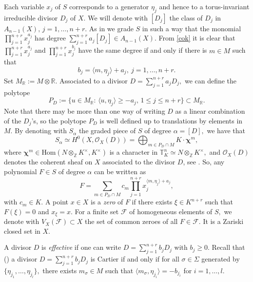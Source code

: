 \documentclass[a4paper,11pt]{amsart}
\newcommand{\R}{\mathbb{R}}
\newcommand{\T}{\mathbb{T}}
\newcommand{\Z}{\mathbb{Z}}
\newcommand{\cF}{{\mathcal F}}
\newcommand{\cO}{{\mathcal O}}
\newcommand{\bfchi}{{\boldsymbol{\chi}}}
\numberwithin{thm}{section}
\numberwithin{equation}{section}
\theoremstyle{definition}
\theoremstyle{plain}
\begin{document}
Each variable $x_j$ of $S$ corresponds to a generator $\eta_j$ and hence to a torus-invariant irreducible divisor $D_j$ of $X.$ We will  denote with $[D_j]$ the class of $D_j$ in $A_{n-1}(X),\, j=1,\ldots, n+r.$ As in \cite{cox95} we grade $S$ in such a way that the monomial
$\prod_{j=1}^{n+r}x_j^{a_j}$ has degree $\sum_{j=1}^{n+r} a_j[D_j]\in A_{n-1}(X).$
From \eqref{cok} it is clear that $\prod_{j=1}^{n+r}x_j^{a_j}$ and $\prod_{j=1}^{n+r}x_j^{b_j}$ have the same degree if and only if there is $m\in M$ such that
\begin{equation}\label{sdg}
b_j=\langle m,\eta_j\rangle+a_j, \ j=1,\ldots, n+r.
\end{equation}
Set $M_\R:= M\otimes\R$. Associated to a divisor
$
D=\sum_{j=1}^{n+r} a_j D_j,$  we can define the polytope
\begin{equation}\label{pd}
P_D:=\{u\in M_\R:\,\langle u,\eta_j\rangle\geq-a_j,\,1\leq j\leq n+r\}\subset M_\R.
\end{equation}
Note that there may be more than one way of writing $D$ as a linear combination of the $D_j$'s, so the polytope $P_D$ is well defined up to translations by elements in $M$.
By denoting with $S_\alpha$ the graded piece of $S$ of degree $\alpha=[D],$ we have that
\begin{equation}\label{kor}
S_\alpha \simeq H^0(X,\cO_X(D))=\bigoplus_{m\in P_D\cap M}K\cdot \bfchi^{m},
\end{equation}
where $\bfchi^m\in \mbox{Hom}(N\otimes_\Z K^\times, K^\times)$ is a character in $\T_{{K}}^n\simeq N\otimes_\Z K^\times,$ and $\cO_X(D)$ denotes the coherent sheaf on $X$ associated to the divisor $D$, see \cite[Proposition 1.1]{cox95}. So, any polynomial $F\in S$ of degree $\alpha$ can be written as
\begin{equation}\label{eFe}
F=\sum_{m\in P_D\cap M}c_m\prod_{j=1}^{n+r}x_j^{\langle m,\eta_j\rangle+a_j},
\end{equation}
with $c_m\in K.$ A point $x\in X$ is a {\em zero} of $F$ if there exists $\xi\in K^{n+r}$ such that $F(\xi)=0$ and $x_\xi=x.$ For a finite set $\cF$ of homogeneous elements of $S,$ we denote with $V_X(\cF)\subset X$ the set of common zeroes of all $F\in\cF.$ It is a Zariski closed set in $X.$



A divisor $D$ is {\em effective} if one can write $D=\sum_{j=1}^{n+r} b_j D_j$ with $b_j\geq0.$
Recall that (\cite[Theorem 4.2.8]{CLS11})  a divisor $D=\sum_{j=1}^{n+r} b_j D_j$ is Cartier if and only if for all $\sigma\in\Sigma$ generated by $\{\eta_{j_1},\ldots, \eta_{j_l}\},$ there exists $m_\sigma\in M$ such that $\langle m_\sigma,\eta_{j_i}\rangle=-b_{j_i}$ for $i=1,\ldots, l.$
\end{document}
